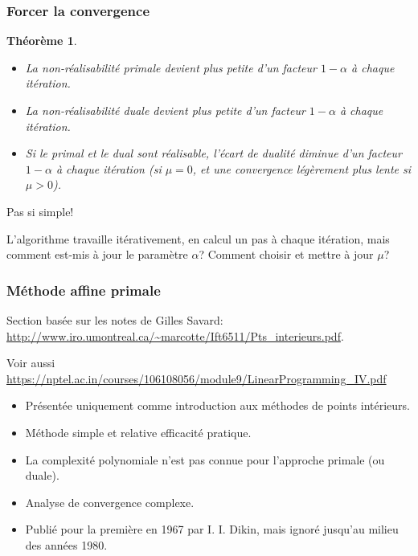 \documentclass[t,usepdftitle=false]{beamer}
\newtheorem{thm}{Théorème}
\begin{document}
\begin{frame}
\frametitle{Forcer la convergence}

\begin{thm}
\begin{itemize}
\item
La non-réalisabilité primale devient plus petite d'un facteur $1 - \alpha$ à chaque itération.
\item
La non-réalisabilité duale devient plus petite d'un facteur $1 - \alpha$ à chaque itération.
\item
Si le primal et le dual sont réalisable, l'écart de dualité diminue d'un facteur $1-\alpha$ à chaque itération (si $\mu = 0$, et une convergence légèrement plus lente si $\mu > 0$).
\end{itemize}
\end{thm}


Pas si simple!

\mbox{}

L'algorithme travaille itérativement, en calcul un pas à chaque itération, mais comment est-mis à jour le paramètre $\alpha$? Comment choisir et mettre à jour $\mu$?

\end{frame}

\begin{frame}
	\frametitle{Méthode affine primale}
	
	Section basée sur les notes de Gilles Savard: \url{http://www.iro.umontreal.ca/~marcotte/Ift6511/Pts_interieurs.pdf}.
	
	Voir aussi \url{https://nptel.ac.in/courses/106108056/module9/LinearProgramming_IV.pdf}

\mbox{}
	
	\begin{itemize}
		\item 
		Présentée uniquement comme introduction aux méthodes de points intérieurs.
		\item
		Méthode simple et relative efficacité pratique.
		\item
		La complexité polynomiale n’est pas connue pour l'approche primale (ou duale).
		\item
		Analyse de convergence complexe.
		\item 
		Publié pour la première en 1967 par I. I. Dikin, mais ignoré jusqu'au milieu des années 1980.
	\end{itemize}
	
\end{frame}
\end{document}
